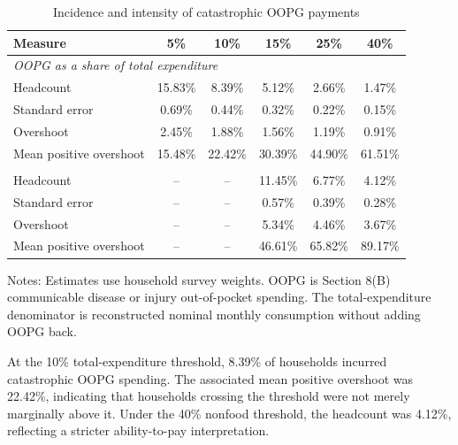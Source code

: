 \documentclass[11pt]{article}
\begin{document}
\begin{table}[!htbp]
\centering
\begin{threeparttable}
\caption{Incidence and intensity of catastrophic OOPG payments}
\label{tab:incidence}
\small
\begin{tabular}{lccccc}
\toprule
Measure & 5\% & 10\% & 15\% & 25\% & 40\% \\
\midrule
\multicolumn{6}{l}{\textit{OOPG as a share of total expenditure}} \\
Headcount & 15.83\% & 8.39\% & 5.12\% & 2.66\% & 1.47\% \\
Standard error & 0.69\% & 0.44\% & 0.32\% & 0.22\% & 0.15\% \\
Overshoot & 2.45\% & 1.88\% & 1.56\% & 1.19\% & 0.91\% \\
Mean positive overshoot & 15.48\% & 22.42\% & 30.39\% & 44.90\% & 61.51\% \\
\addlinespace
\multicolumn{6}{l}{\textit{OOPG as a share of nonfood expenditure}} \\
Headcount & -- & -- & 11.45\% & 6.77\% & 4.12\% \\
Standard error & -- & -- & 0.57\% & 0.39\% & 0.28\% \\
Overshoot & -- & -- & 5.34\% & 4.46\% & 3.67\% \\
Mean positive overshoot & -- & -- & 46.61\% & 65.82\% & 89.17\% \\
\bottomrule
\end{tabular}
\begin{tablenotes}
\small
\item Notes: Estimates use household survey weights. OOPG is Section 8(B) communicable disease or injury out-of-pocket spending. The total-expenditure denominator is reconstructed nominal monthly consumption without adding OOPG back.
\end{tablenotes}
\end{threeparttable}
\end{table}

At the 10\% total-expenditure threshold, 8.39\% of households incurred catastrophic OOPG spending. The associated mean positive overshoot was 22.42\%, indicating that households crossing the threshold were not merely marginally above it. Under the 40\% nonfood threshold, the headcount was 4.12\%, reflecting a stricter ability-to-pay interpretation.
\end{document}
